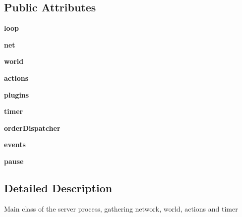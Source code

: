 \subsection*{\-Public \-Attributes}
\begin{DoxyCompactItemize}
\item 
\hypertarget{classserver_1_1_server_aa66c4b037c112c4777cdc3d0b021bf0a}{{\bfseries loop}}\label{classserver_1_1_server_aa66c4b037c112c4777cdc3d0b021bf0a}

\item 
\hypertarget{classserver_1_1_server_a7c744a2e1c5d36f4e41ee16b15eddec0}{{\bfseries net}}\label{classserver_1_1_server_a7c744a2e1c5d36f4e41ee16b15eddec0}

\item 
\hypertarget{classserver_1_1_server_afb24f0dc3380595ca5fa1e3720eddf91}{{\bfseries world}}\label{classserver_1_1_server_afb24f0dc3380595ca5fa1e3720eddf91}

\item 
\hypertarget{classserver_1_1_server_ac18f6cc461c554eb4f5975bae585beb1}{{\bfseries actions}}\label{classserver_1_1_server_ac18f6cc461c554eb4f5975bae585beb1}

\item 
\hypertarget{classserver_1_1_server_a173029dc00b8683b075d277c668617b9}{{\bfseries plugins}}\label{classserver_1_1_server_a173029dc00b8683b075d277c668617b9}

\item 
\hypertarget{classserver_1_1_server_a648310f189b51c6fe5b0c9b925c638ae}{{\bfseries timer}}\label{classserver_1_1_server_a648310f189b51c6fe5b0c9b925c638ae}

\item 
\hypertarget{classserver_1_1_server_a7bef2487ef91bc73d3c7686ddd42daf2}{{\bfseries order\-Dispatcher}}\label{classserver_1_1_server_a7bef2487ef91bc73d3c7686ddd42daf2}

\item 
\hypertarget{classserver_1_1_server_a59d51ebb6587b77ef52a1f2533a0c7a8}{{\bfseries events}}\label{classserver_1_1_server_a59d51ebb6587b77ef52a1f2533a0c7a8}

\item 
\hypertarget{classserver_1_1_server_a7e6fa74117ab619b24b38bedb698b26e}{{\bfseries pause}}\label{classserver_1_1_server_a7e6fa74117ab619b24b38bedb698b26e}

\end{DoxyCompactItemize}


\subsection{\-Detailed \-Description}
\begin{DoxyVerb}Main class of the server process, gathering network, world, actions and timer \end{DoxyVerb}
 

